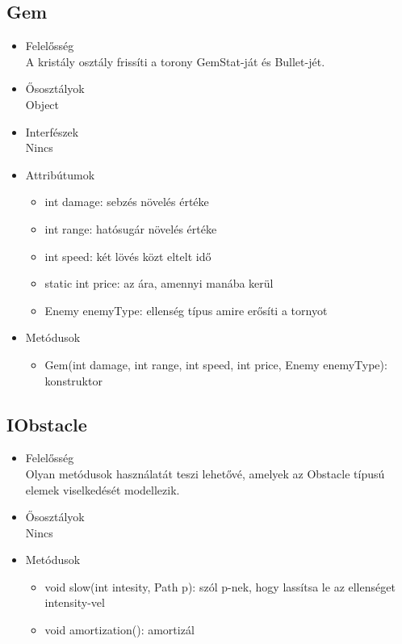 \subsection{Gem}
\begin{itemize}
\item Felelősség\\
A kristály osztály frissíti a torony GemStat-ját és Bullet-jét.
\item Ősosztályok\\
Object
\item Interfészek\\
Nincs
\item Attribútumok
	\begin{itemize}
		\item int damage: sebzés növelés értéke
		\item int range: hatósugár növelés értéke
		\item int speed: két lövés közt eltelt idő
		\item static int price: az ára, amennyi manába kerül
		\item Enemy enemyType: ellenség típus amire erősíti a tornyot
	\end{itemize}
\item Metódusok
	\begin{itemize}
		
		\item Gem(int damage, int range, int speed, int price, Enemy enemyType): konstruktor
		
		
	\end{itemize}
\end{itemize}

\subsection{IObstacle}
\begin{itemize}
\item Felelősség\\
Olyan metódusok használatát teszi lehetővé, amelyek az Obstacle típusú elemek viselkedését modellezik.
\item Ősosztályok\\
Nincs

\item Metódusok
	\begin{itemize}
		\item void slow(int intesity, Path p): szól p-nek, hogy lassítsa le az ellenséget intensity-vel
		\item void amortization(): amortizál
		
		
	\end{itemize}
\end{itemize}
